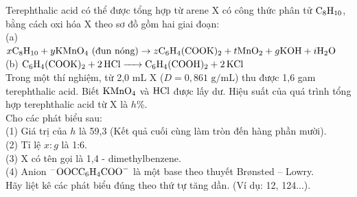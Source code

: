 \documentclass[11pt,a4paper]{article}
\begin{document}
\begin{ex}
Terephthalic acid có thể được tổng hợp từ arene X có công thức phân tử $\ce{C8H10}$, bằng cách oxi hóa X theo sơ đồ gồm hai giai đoạn:\\
(a) $x\ce{C8H10} + y\ce{KMnO4}\text{ (đun nóng)} \rightarrow z\ce{C6H4(COOK)2} + t\ce{MnO2} + g\ce{KOH} + i\ce{H2O}$\\
(b) $\ce{C6H4(COOK)2 + 2HCl -> C6H4(COOH)2 + 2KCl}$\\
Trong một thí nghiệm, từ 2,0 mL X ($D = 0{,}861\text{ g/mL}$) thu được 1,6 gam terephthalic acid. Biết $\ce{KMnO4}$ và $\ce{HCl}$ được lấy dư. Hiệu suất của quá trình tổng hợp terephthalic acid từ X là $h$\%.\\
Cho các phát biểu sau:\\
(1) Giá trị của $h$ là 59,3 (Kết quả cuối cùng làm tròn đến hàng phần mười).\\
(2) Tỉ lệ $x : g$ là 1:6.\\
(3) X có tên gọi là 1,4 - dimethylbenzene.\\
(4) Anion $^-\ce{OOCC6H4COO-}$ là một base theo thuyết Brønsted – Lowry.\\
Hãy liệt kê các phát biểu đúng theo thứ tự tăng dần. (Ví dụ: 12, 124...).

\end{ex}
\end{document}
